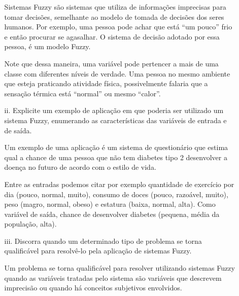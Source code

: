 \documentclass{report}
\begin{document}
\begin{enumerate}
\begin{enumerate}
Sistemas Fuzzy são sistemas que utiliza de informações imprecisas para tomar decisões, semelhante 
ao modelo de tomada de decisões dos seres humanos. Por exemplo, uma pessoa pode achar que está ``um pouco'' 
frio e então procurar se agasalhar. O sistema de decisão adotado por essa pessoa, é um modelo Fuzzy. 

Note que dessa maneira, uma variável pode pertencer a mais de uma classe com diferentes níveis de verdade. Uma pessoa no
mesmo ambiente que esteja praticando atividade física, possivelmente falaria que a sensação térmica está ``normal'' ou mesmo
``calor''.

\item[ii.] Explicite um exemplo de aplicação em que poderia ser utilizado um sistema Fuzzy, 
enumerando as características das variáveis de entrada e de saída.

Um exemplo de uma aplicação é um sistema de questionário que estima qual a chance de uma pessoa que não tem diabetes tipo 2
desenvolver a doença no futuro de acordo com o estilo de vida. 

Entre as entradas podemos citar por exemplo quantidade 
de exercício por dia (pouco, normal, muito), consumo de doces (pouco, razoável, muito), peso (magro, normal, obeso) e 
estatura (baixa, normal, alta).  Como variável de saída, chance de desenvolver diabetes (pequena, média da população, alta).

\item[iii.] Discorra quando um determinado tipo de problema se torna qualificável para 
resolvê-lo pela aplicação de sistemas Fuzzy.

Um problema se torna qualificável para resolver utilizando sistemas Fuzzy quando as variáveis tratadas pelo sistema são
variáveis que descrevem imprecisão ou quando há conceitos subjetivos envolvidos.

\end{enumerate}

\end{enumerate}
\end{document}
